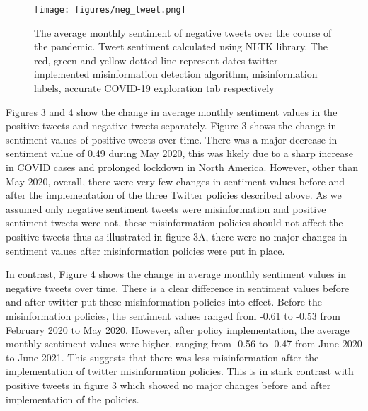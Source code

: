 \documentclass[10pt,twocolumn,letterpaper]{article}
\begin{document}
\begin{figure}
  \centering
  \texttt{[image: figures/neg\_tweet.png]}
  \caption{The average monthly sentiment of negative tweets over the course of the pandemic. Tweet sentiment calculated using NLTK library. The red, green and yellow dotted line represent dates twitter implemented misinformation detection algorithm, misinformation labels, accurate COVID-19 exploration tab respectively 
}
\end{figure}
Figures 3 and 4 show the change in average monthly sentiment values in the positive tweets and negative tweets separately. Figure 3 shows the change in sentiment values of positive tweets over time. There was a major decrease in sentiment value of 0.49 during May 2020, this was likely due to a sharp increase in COVID cases and prolonged lockdown in North America. However, other than May 2020, overall, there were very few changes in sentiment values before and after the implementation of the three Twitter policies described above. As we assumed only negative sentiment tweets were misinformation and positive sentiment tweets were not, these misinformation policies should not affect the positive tweets thus as illustrated in figure 3A, there were no major changes in sentiment values after misinformation policies were put in place. 

In contrast, Figure 4 shows the change in average monthly sentiment values in negative tweets over time. There is a clear difference in sentiment values before and after twitter put these misinformation policies into effect. Before the misinformation policies, the sentiment values ranged from -0.61 to -0.53 from February 2020 to May 2020. However, after policy implementation, the average monthly sentiment values were higher, ranging from -0.56 to -0.47 from June 2020 to June 2021. This suggests that there was less misinformation after the implementation of twitter misinformation policies. This is in stark contrast with positive tweets in figure 3 which showed no major changes before and after implementation of the policies. 
\end{document}
